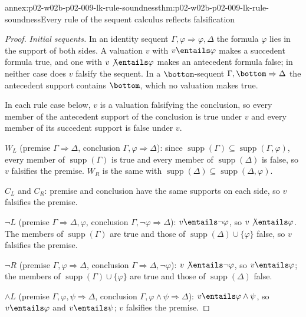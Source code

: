 \begin{annexitem}{annex:p02-w02b-p02-009-lk-rule-soundness}{thm:p02-w02b-p02-009-lk-rule-soundness}{Every rule of the sequent calculus reflects falsification}
\begin{proof}
\emph{Initial sequents.}  In an identity sequent
\(\Gamma,\varphi\Rightarrow\varphi,\Delta\) the formula \(\varphi\) lies in
the support of both sides.  A valuation \(v\) with \(v\entails\varphi\) makes
a succedent formula true, and one with \(v\not\entails\varphi\) makes an
antecedent formula false; in neither case does \(v\) falsify the sequent.  In
a \(\bottom\)-sequent \(\Gamma,\bottom\Rightarrow\Delta\) the antecedent
support contains \(\bottom\), which no valuation makes true.

In each rule case below, \(v\) is a valuation falsifying the conclusion, so
every member of the antecedent support of the conclusion is true under \(v\)
and every member of its succedent support is false under \(v\).

\(W_L\) (premise \(\Gamma\Rightarrow\Delta\), conclusion
\(\Gamma,\varphi\Rightarrow\Delta\)): since
\(\operatorname{supp}(\Gamma)\subseteq\operatorname{supp}(\Gamma,\varphi)\),
every member of \(\operatorname{supp}(\Gamma)\) is true and every member of
\(\operatorname{supp}(\Delta)\) is false, so \(v\) falsifies the premise.
\(W_R\) is the same with
\(\operatorname{supp}(\Delta)\subseteq\operatorname{supp}(\Delta,\varphi)\).

\(C_L\) and \(C_R\): premise and conclusion have the same supports on each
side, so \(v\) falsifies the premise.

\(\neg L\) (premise \(\Gamma\Rightarrow\Delta,\varphi\), conclusion
\(\Gamma,\neg\varphi\Rightarrow\Delta\)): \(v\entails\neg\varphi\), so
\(v\not\entails\varphi\).  The members of \(\operatorname{supp}(\Gamma)\) are
true and those of \(\operatorname{supp}(\Delta)\cup\{\varphi\}\) false, so
\(v\) falsifies the premise.

\(\neg R\) (premise \(\Gamma,\varphi\Rightarrow\Delta\), conclusion
\(\Gamma\Rightarrow\Delta,\neg\varphi\)): \(v\not\entails\neg\varphi\), so
\(v\entails\varphi\); the members of
\(\operatorname{supp}(\Gamma)\cup\{\varphi\}\) are true and those of
\(\operatorname{supp}(\Delta)\) false.

\(\land L\) (premise \(\Gamma,\varphi,\psi\Rightarrow\Delta\), conclusion
\(\Gamma,\varphi\land\psi\Rightarrow\Delta\)): \(v\entails\varphi\land\psi\),
so \(v\entails\varphi\) and \(v\entails\psi\); \(v\) falsifies the premise.


\end{proof}
\end{annexitem}
